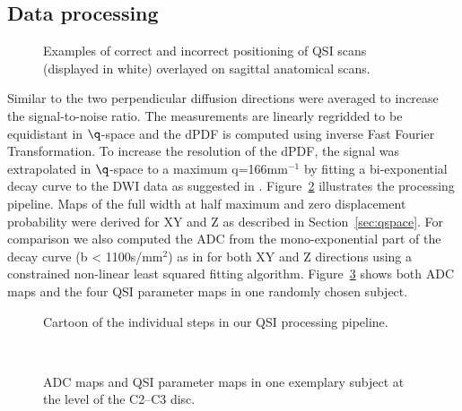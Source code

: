 \subsection{Data processing}
\begin{figure}[tb]
\centering
	\hspace{0.015\textwidth}
\caption{Examples of correct and incorrect positioning of QSI scans (displayed in white) overlayed on sagittal anatomical scans.}
\label{fig:chapter5 positioning}
\end{figure}
Similar to \citet{Farrell:2008} the two perpendicular diffusion directions were averaged to increase the signal-to-noise ratio. The measurements are linearly regridded to be equidistant in $\q$-space and the  {\gls{dPDF}} is computed using inverse Fast Fourier Transformation. To increase the resolution of the  {\gls{dPDF}}, the signal was extrapolated in $\q$-space to a maximum q=166mm$^{-1}$ by fitting a bi-exponential decay curve to the {\gls{DWI}} data as suggested in \citet{Cohen:2002, Farrell:2008}. Figure~\ref{fig:chapter5 exp1 processing pipeline} illustrates the processing pipeline. Maps of the full width at half maximum and zero displacement probability were derived for XY and Z as described in Section~\ref{sec:qspace}. For comparison we also computed the \gls{ADC} from the mono-exponential part of the decay curve (b < 1100s/mm$^2$) as in \citet{Farrell:2008} for both XY and Z directions using a constrained non-linear least squared fitting algorithm. Figure~\ref{fig:chapter5 exemplary maps} shows both \gls{ADC} maps and the four \gls{QSI} parameter maps in one randomly chosen subject.
\begin{figure}[p]
  \caption{Cartoon of the individual steps in our QSI processing pipeline.}
  \label{fig:chapter5 exp1 processing pipeline}
\end{figure}
\begin{figure}[p]
\centering
{}
\\
\caption{ADC maps and QSI parameter maps in one exemplary subject at the level of the C2--C3 disc.}
\label{fig:chapter5 exemplary maps}
\end{figure}


